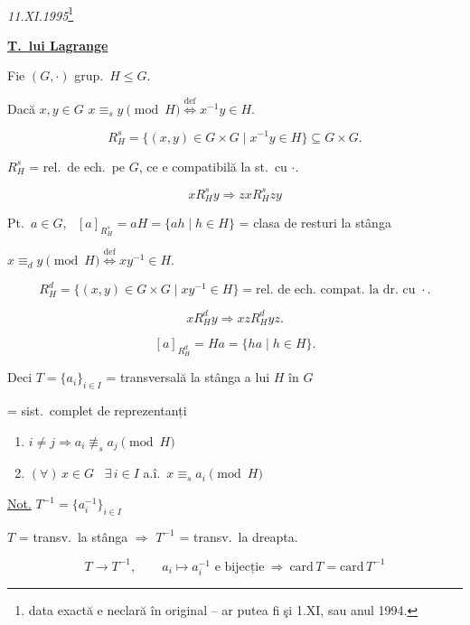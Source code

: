 \documentclass[12pt]{article}
\begin{document}
\begin{center}
\\[2pt]
\end{center}
\begin{flushright}
\textit{11.XI.1995}\footnote{data exactă e neclară în original -- ar putea fi şi 1.XI, sau anul 1994.}
\end{flushright}

\bigskip
\noindent\underline{\textbf{T.\ lui Lagrange}}

\bigskip
\noindent Fie $(G,\cdot)$ grup.\ $H\leq G$.

\noindent Dacă $x,y\in G$ \quad $x\equiv_s y \pmod H \overset{\text{def}}{\Longleftrightarrow} x^{-1}y\in H$.

\[
R_H^s = \{(x,y)\in G\times G \mid x^{-1}y\in H\} \subseteq G\times G.
\]

\noindent $R_H^s$ = rel.\ de ech.\ pe $G$, ce e compatibilă la st.\ cu $\cdot$.

\[
xR_H^s y \Rightarrow zxR_H^s zy
\]

\noindent Pt.\ $a\in G$, \ $[a]_{R_H^s} = aH = \{ah \mid h\in H\}$ = clasa de resturi la stânga

\bigskip
\noindent $x\equiv_d y \pmod H \overset{\text{def}}{\Longleftrightarrow} xy^{-1}\in H$.

\[
R_H^d = \{(x,y)\in G\times G \mid xy^{-1}\in H\} = \text{rel.\ de ech.\ compat.\ la dr.\ cu } \cdot.
\]

\[
xR_H^d y \Rightarrow xzR_H^d yz.
\]

\[
[a]_{R_H^d} = Ha = \{ha \mid h\in H\}.
\]

\bigskip
\noindent Deci $T=\{a_i\}_{i\in I}$ = transversală la stânga a lui $H$ în $G$

\noindent = sist.\ complet de reprezentanți

\begin{enumerate}
\item[1)] $i\neq j \Rightarrow a_i \not\equiv_s a_j \pmod H$
\item[2)] $(\forall)\, x\in G$ \ $\exists\, i\in I$ a.î.\ $x\equiv_s a_i \pmod H$
\end{enumerate}

\bigskip
\noindent\underline{Not.} $T^{-1} = \{a_i^{-1}\}_{i\in I}$

\noindent $T$ = transv.\ la stânga $\Rightarrow$ $T^{-1}$ = transv.\ la dreapta.

\[
T \xrightarrow{\ } T^{-1}, \qquad a_i \mapsto a_i^{-1} \text{ e bijecție} \ \Rightarrow \ \text{card}\, T = \text{card}\, T^{-1}
\]
\end{document}
